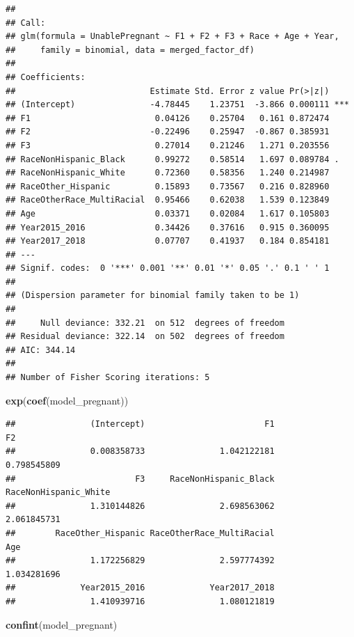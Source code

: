 \documentclass[
]{article}
\newenvironment{Shaded}{\begin{snugshade}}{\end{snugshade}}
\newcommand{\FunctionTok}[1]{\textcolor[rgb]{0.13,0.29,0.53}{\textbf{#1}}}
\newcommand{\NormalTok}[1]{#1}
\begin{document}
\begin{verbatim}
## 
## Call:
## glm(formula = UnablePregnant ~ F1 + F2 + F3 + Race + Age + Year, 
##     family = binomial, data = merged_factor_df)
## 
## Coefficients:
##                           Estimate Std. Error z value Pr(>|z|)    
## (Intercept)               -4.78445    1.23751  -3.866 0.000111 ***
## F1                         0.04126    0.25704   0.161 0.872474    
## F2                        -0.22496    0.25947  -0.867 0.385931    
## F3                         0.27014    0.21246   1.271 0.203556    
## RaceNonHispanic_Black      0.99272    0.58514   1.697 0.089784 .  
## RaceNonHispanic_White      0.72360    0.58356   1.240 0.214987    
## RaceOther_Hispanic         0.15893    0.73567   0.216 0.828960    
## RaceOtherRace_MultiRacial  0.95466    0.62038   1.539 0.123849    
## Age                        0.03371    0.02084   1.617 0.105803    
## Year2015_2016              0.34426    0.37616   0.915 0.360095    
## Year2017_2018              0.07707    0.41937   0.184 0.854181    
## ---
## Signif. codes:  0 '***' 0.001 '**' 0.01 '*' 0.05 '.' 0.1 ' ' 1
## 
## (Dispersion parameter for binomial family taken to be 1)
## 
##     Null deviance: 332.21  on 512  degrees of freedom
## Residual deviance: 322.14  on 502  degrees of freedom
## AIC: 344.14
## 
## Number of Fisher Scoring iterations: 5
\end{verbatim}

\begin{Shaded}
\begin{Highlighting}[]
\FunctionTok{exp}\NormalTok{(}\FunctionTok{coef}\NormalTok{(model\_pregnant))}
\end{Highlighting}
\end{Shaded}

\begin{verbatim}
##               (Intercept)                        F1                        F2 
##               0.008358733               1.042122181               0.798545809 
##                        F3     RaceNonHispanic_Black     RaceNonHispanic_White 
##               1.310144826               2.698563062               2.061845731 
##        RaceOther_Hispanic RaceOtherRace_MultiRacial                       Age 
##               1.172256829               2.597774392               1.034281696 
##             Year2015_2016             Year2017_2018 
##               1.410939716               1.080121819
\end{verbatim}

\begin{Shaded}
\begin{Highlighting}[]
\FunctionTok{confint}\NormalTok{(model\_pregnant)}
\end{Highlighting}
\end{Shaded}
\end{document}
